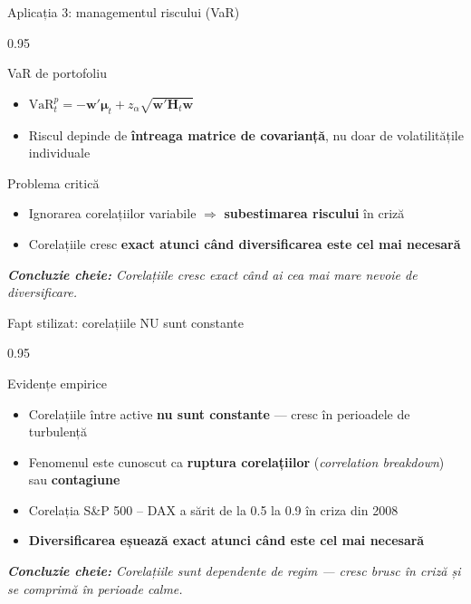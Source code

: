 \documentclass[9pt, aspectratio=169, t]{beamer}
\begin{document}
\begin{frame}{Aplicația 3: managementul riscului (VaR)}
    \begin{cminipage}{0.95\textwidth}
    {\footnotesize
    \begin{block}{VaR de portofoliu}
        \begin{itemize}\setlength{\itemsep}{2pt}
            \item $\text{VaR}_t^p = -\mathbf{w}'\boldsymbol{\mu}_t + z_\alpha \sqrt{\mathbf{w}'\mathbf{H}_t\mathbf{w}}$
            \item Riscul depinde de \textbf{întreaga matrice de covarianță}, nu doar de volatilitățile individuale
        \end{itemize}
    \end{block}
    \vspace{0.1cm}
    \begin{alertblock}{Problema critică}
        \begin{itemize}\setlength{\itemsep}{0pt}
            \item Ignorarea corelațiilor variabile $\Rightarrow$ \textbf{subestimarea riscului} în criză
            \item Corelațiile cresc \textbf{exact atunci când diversificarea este cel mai necesară}
        \end{itemize}
    \end{alertblock}
    \vspace{0.2cm}
    \textit{\textbf{Concluzie cheie:} Corelațiile cresc exact când ai cea mai mare nevoie de diversificare.}
    }
    \end{cminipage}
\end{frame}

\begin{frame}{Fapt stilizat: corelațiile NU sunt constante}
    \begin{cminipage}{0.95\textwidth}
    {\footnotesize
    \begin{block}{Evidențe empirice}
        \begin{itemize}\setlength{\itemsep}{2pt}
            \item Corelațiile între active \textbf{nu sunt constante} --- cresc în perioadele de turbulență
            \item Fenomenul este cunoscut ca \textbf{ruptura corelațiilor} (\textit{correlation breakdown}) sau \textbf{contagiune}
            \item Corelația S\&P 500 -- DAX a sărit de la 0.5 la 0.9 în criza din 2008
            \item \textbf{Diversificarea eșuează exact atunci când este cel mai necesară}
        \end{itemize}
    \end{block}
    \vspace{0.2cm}
    \textit{\textbf{Concluzie cheie:} Corelațiile sunt dependente de regim --- cresc brusc în criză și se comprimă în perioade calme.}
    }
    \end{cminipage}
\end{frame}
\end{document}
